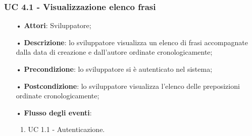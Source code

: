 \subsubsection{UC 4.1 - Visualizzazione elenco frasi}
\begin{itemize}
\item[•]\textbf{Attori}: Sviluppatore;
\item[•]\textbf{Descrizione}: lo sviluppatore visualizza un elenco di frasi accompagnate dalla data di creazione e dall’autore ordinate cronologicamente;
\item[•]\textbf{Precondizione}:  lo sviluppatore si è autenticato nel sistema;%
\item[•]\textbf{Postcondizione}: lo sviluppatore visualizza l'elenco delle preposizioni ordinate cronologicamente;
\item[•]\textbf{Flusso degli eventi}: 
\begin{enumerate}
	\item UC 1.1 - Autenticazione.
\end{enumerate}
\end{itemize}
